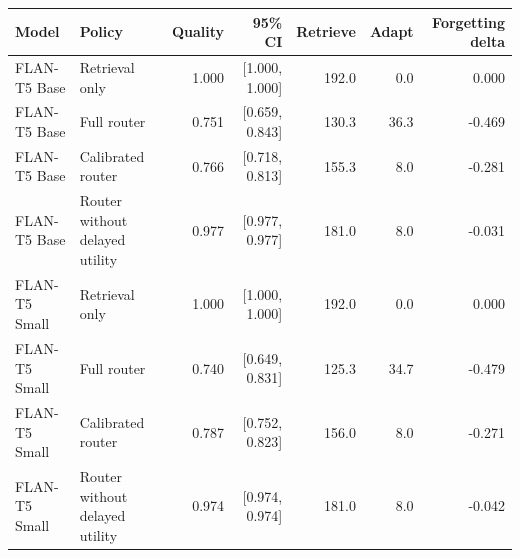 \begin{tabular}{llrrrrr}
\toprule
Model & Policy & Quality & 95\% CI & Retrieve & Adapt & Forgetting delta \\
\midrule
FLAN-T5 Base & Retrieval only & 1.000 & [1.000, 1.000] & 192.0 & 0.0 & 0.000 \\
FLAN-T5 Base & Full router & 0.751 & [0.659, 0.843] & 130.3 & 36.3 & -0.469 \\
FLAN-T5 Base & Calibrated router & 0.766 & [0.718, 0.813] & 155.3 & 8.0 & -0.281 \\
FLAN-T5 Base & Router without delayed utility & 0.977 & [0.977, 0.977] & 181.0 & 8.0 & -0.031 \\
FLAN-T5 Small & Retrieval only & 1.000 & [1.000, 1.000] & 192.0 & 0.0 & 0.000 \\
FLAN-T5 Small & Full router & 0.740 & [0.649, 0.831] & 125.3 & 34.7 & -0.479 \\
FLAN-T5 Small & Calibrated router & 0.787 & [0.752, 0.823] & 156.0 & 8.0 & -0.271 \\
FLAN-T5 Small & Router without delayed utility & 0.974 & [0.974, 0.974] & 181.0 & 8.0 & -0.042 \\
\bottomrule
\end{tabular}
